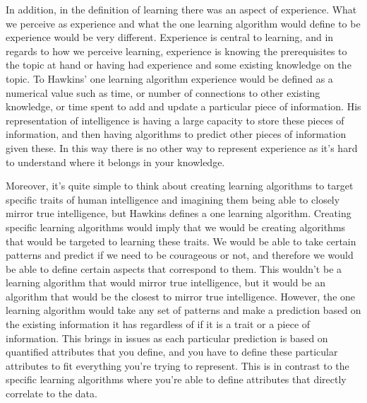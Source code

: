 \documentclass[11pt, oneside]{article}
\begin{document}

\par In addition, in the definition of learning there was an aspect of experience. What we perceive as experience and what the one learning algorithm would define to be experience would be very different. Experience is central to learning, and in regards to how we perceive learning, experience is knowing the prerequisites to the topic at hand or having had experience and some existing knowledge on the topic. To Hawkins' one learning algorithm experience would be defined as a numerical value such as time, or number of connections to other existing knowledge, or time spent to add and update a particular piece of information. His representation of intelligence is having a large capacity to store these pieces of information, and then having algorithms to predict other pieces of information given these. In this way there is no other way to represent experience as it's hard to understand where it belongs in your knowledge.

\par Moreover, it's quite simple to think about creating learning algorithms to target specific traits of human intelligence and imagining them being able to closely mirror true intelligence, but Hawkins defines a one learning algorithm. Creating specific learning algorithms would imply that we would be creating algorithms that would be targeted to learning these traits. We would be able to take certain patterns and predict if we need to be courageous or not, and therefore we would be able to define certain aspects that correspond to them. This wouldn't be a learning algorithm that would mirror true intelligence, but it would be an algorithm that would be the closest to mirror true intelligence. However, the one learning algorithm would take any set of patterns and make a prediction based on the existing information it has regardless of if it is a trait or a piece of information. This brings in issues as each particular prediction is based on quantified attributes that you define, and you have to define these particular attributes to fit everything you're trying to represent. This is in contrast to the specific learning algorithms where you're able to define attributes that directly correlate to the data.
\end{document}
